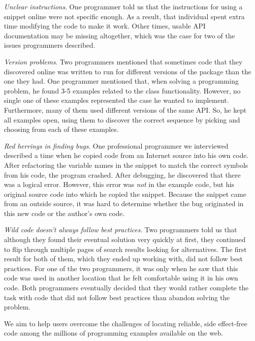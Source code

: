 \emph{Unclear instructions}.
One programmer told us that the instructions for using a snippet online were not specific enough.
As a result, that individual spent extra time modifying the code to make it work.
Other times, usable API documentation may be missing altogether, which was the case for two of the issues programmers described.

\emph{Version problems}.
Two programmers mentioned that sometimes code that they discovered online was written to run for different versions of the package than the one they had.
One programmer mentioned that, when solving a programming problem, he found 3-5 examples related to the class functionality.
However, no single one of these examples represented the case he wanted to implement.
Furthermore, many of them used different versions of the same API.
So, he kept all examples open, using them to discover the correct sequence by picking and choosing from each of these examples.

\emph{Red herrings in finding bugs}.
One professional programmer we interviewed described a time when he copied code from an Internet source into his own code.
After refactoring the variable names in the snippet to match the correct symbols from his code, the program crashed.
After debugging, he discovered that there was a logical error.
However, this error was \emph{not} in the example code, but his original source code into which he copied the snippet.
Because the snippet came from an outside source, it was hard to determine whether the bug originated in this new code or the author's own code.

\emph{Wild code doesn't always follow best practices}.
Two programmers told us that although they found their eventual solution very quickly at first, they continued to flip through multiple pages of search results looking for alternatives.
The first result for both of them, which they ended up working with, did not follow best practices.
For one of the two programmers, it was only when he saw that this code was used in another location that he felt comfortable using it in his own code.
Both programmers eventually decided that they would rather complete the task with code that did not follow best practices than abandon solving the problem.

We aim to help users overcome the challenges of locating reliable, side effect-free code among the millions of programming examples available on the web.
